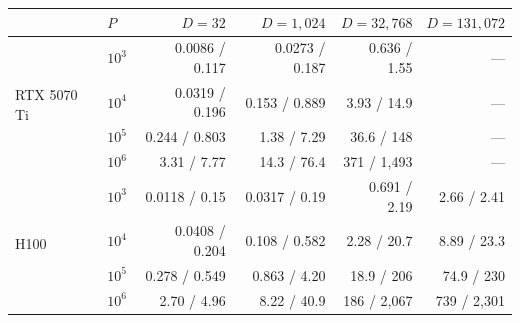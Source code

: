 \begin{tabular}{ll|rrrr}
\hline
 & $P$ & $D{=}32$ & $D{=}1{,}024$ & $D{=}32{,}768$ & $D{=}131{,}072$ \\
\hline
\multirow{4}{*}{RTX 5070 Ti} & $10^{3}$ & 0.0086 / 0.117 & 0.0273 / 0.187 & 0.636 / 1.55 & --- \\
 & $10^{4}$ & 0.0319 / 0.196 & 0.153 / 0.889 & 3.93 / 14.9 & --- \\
 & $10^{5}$ & 0.244 / 0.803 & 1.38 / 7.29 & 36.6 / 148 & --- \\
 & $10^{6}$ & 3.31 / 7.77 & 14.3 / 76.4 & 371 / 1,493 & --- \\
\hline
\multirow{4}{*}{H100} & $10^{3}$ & 0.0118 / 0.15 & 0.0317 / 0.19 & 0.691 / 2.19 & 2.66 / 2.41 \\
 & $10^{4}$ & 0.0408 / 0.204 & 0.108 / 0.582 & 2.28 / 20.7 & 8.89 / 23.3 \\
 & $10^{5}$ & 0.278 / 0.549 & 0.863 / 4.20 & 18.9 / 206 & 74.9 / 230 \\
 & $10^{6}$ & 2.70 / 4.96 & 8.22 / 40.9 & 186 / 2,067 & 739 / 2,301 \\
\hline
\end{tabular}

